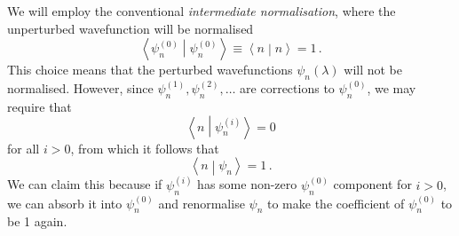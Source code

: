 \documentclass{article}
\theoremstyle{plain}\theoremheaderfont{\normalfont\itshape}\theorembodyfont{\rmfamily}\theoremseparator{.}\newtheorem*{rem}{Remark}\newtheorem*{ex}{Example}\newtheorem*{proof}{Proof}\newtheorem*{altp}{Alternative proof}
\theoremstyle{plain}\theoremheaderfont{\normalfont\bfseries}\theorembodyfont{\rmfamily}\theoremseparator{.}\newtheorem{thm}{Theorem}[section]\newtheorem{lem}[thm]{Lemma}\newtheorem{prop}[thm]{Proposition}\newtheorem*{cor}{Corollary}\newtheorem{defn}[thm]{Definition}\newtheorem{clm}[thm]{Claim}\newtheorem{clminproof}{Claim}
\theoremstyle{break}\theoremheaderfont{\normalfont\itshape}\theorembodyfont{\rmfamily}\theoremseparator{.\medskip}\newtheorem*{proofskip}{Proof}\newtheorem*{exs}{Examples}\newtheorem*{rems}{Remarks}
\theoremstyle{break}\theoremheaderfont{\normalfont\bfseries}\theorembodyfont{\rmfamily}\theoremseparator{.\medskip}\newtheorem{lemskip}[thm]{Lemma}\newtheorem{defnskip}[thm]{Definition}\newtheorem{propskip}[thm]{Proposition}\newtheorem{thmskip}[thm]{Theorem}
\numberwithin{equation}{section}
\newcommand{\braket}[2]{\left\langle #1 \middle| #2 \right\rangle}
\begin{document}
    We will employ the conventional \textit{intermediate normalisation}, where the unperturbed wavefunction will be normalised
    \begin{equation}
        \braket{\psi_n^{(0)}}{\psi_n^{(0)}}\equiv\braket{n}{n}=1\,.
    \end{equation}
    This choice means that the perturbed wavefunctions \(\psi_n(\lambda)\) will not be normalised. However, since \(\psi_n^{(1)},\psi_n^{(2)},\dots\) are corrections to \(\psi_n^{(0)}\), we may require that
    \begin{equation}
        \braket{n}{\psi_n^{(i)}}=0
    \end{equation}
    for all \(i>0\), from which it follows that
    \begin{equation}
        \braket{n}{\psi_n}=1\,.
    \end{equation}
    We can claim this because if \(\psi_n^{(i)}\) has some non-zero \(\psi_n^{(0)}\) component for \(i>0\), we can absorb it into \(\psi_n^{(0)}\) and renormalise \(\psi_n\) to make the coefficient of \(\psi_n^{(0)}\) to be 1 again.
\end{document}
